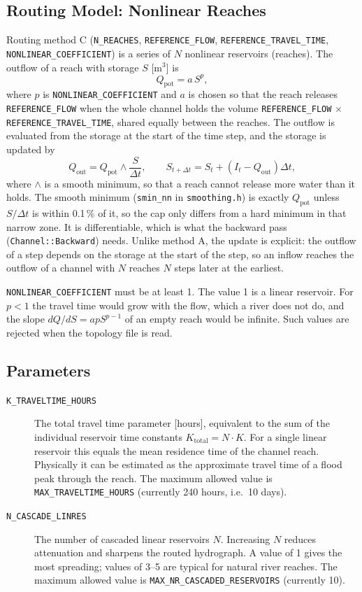 \documentclass[a4paper, 12pt]{report}
\begin{document}
	\subsection{Routing Model: Nonlinear Reaches}
	Routing method C (\texttt{N\_REACHES}, \texttt{REFERENCE\_FLOW}, \texttt{REFERENCE\_TRAVEL\_TIME},
	\texttt{NONLINEAR\_COEFFICIENT}) is a series of $N$ nonlinear reservoirs (reaches). The outflow of a reach
	with storage $S$ [m$^3$] is
	\[
	Q_\mathrm{pot} = a \, S^{p},
	\]
	where $p$ is \texttt{NONLINEAR\_COEFFICIENT} and $a$ is chosen so that the reach releases
	\texttt{REFERENCE\_FLOW} when the whole channel holds the volume \texttt{REFERENCE\_FLOW} $\times$
	\texttt{REFERENCE\_TRAVEL\_TIME}, shared equally between the reaches. The outflow is evaluated from the
	storage at the start of the time step, and the storage is updated by
	\[
	Q_\mathrm{out} = Q_\mathrm{pot} \wedge \frac{S}{\Delta t}, \qquad
	S_{t+\Delta t} = S_t + \left(I_t - Q_\mathrm{out}\right)\Delta t ,
	\]
	where $\wedge$ is a smooth minimum, so that a reach cannot release more water than it holds. The smooth minimum
	(\texttt{smin\_nn} in \texttt{smoothing.h}) is exactly $Q_\mathrm{pot}$ unless $S/\Delta t$ is within 0.1\,\%
	of it, so the cap only differs from a hard minimum in that narrow zone. It is differentiable, which is
	what the backward pass (\texttt{Channel::Backward}) needs. Unlike method A, the update is explicit: the outflow
	of a step depends on the storage at the start of the step, so an inflow reaches the outflow of a channel with $N$
	reaches $N$ steps later at the earliest.

	\texttt{NONLINEAR\_COEFFICIENT} must be at least 1. The value 1 is a linear reservoir. For $p < 1$ the travel time
	would grow with the flow, which a river does not do, and the slope $dQ/dS = a p S^{p-1}$ of an empty reach would be
	infinite. Such values are rejected when the topology file is read.

	\subsection{Parameters}

	\begin{description}
		\item[\texttt{K\_TRAVELTIME\_HOURS}] The total travel time parameter [hours], equivalent
		to the sum of the individual reservoir time constants
		$K_\mathrm{total} = N \cdot K$. For a single linear reservoir this equals the
		mean residence time of the channel reach. Physically it can be estimated as the
		approximate travel time of a flood peak through the reach. The maximum allowed value
		is \texttt{MAX\_TRAVELTIME\_HOURS} (currently 240 hours, i.e.\ 10 days).
	
		\item[\texttt{N\_CASCADE\_LINRES}] The number of cascaded linear reservoirs $N$.
		Increasing $N$ reduces attenuation and sharpens the routed hydrograph. A value of
		1 gives the most spreading; values of 3--5 are typical for natural river reaches.
		The maximum allowed value is \texttt{MAX\_NR\_CASCADED\_RESERVOIRS} (currently 10).
	\end{description}
\end{document}
